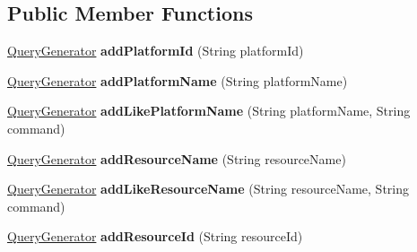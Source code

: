 \subsection*{Public Member Functions}
\begin{DoxyCompactItemize}
\item 
\hyperlink{classeu_1_1h2020_1_1symbiote_1_1query_1_1QueryGenerator}{Query\+Generator} {\bfseries add\+Platform\+Id} (String platform\+Id)\hypertarget{classeu_1_1h2020_1_1symbiote_1_1query_1_1QueryGenerator_a343acf8af004a11d7e8e9e6ce8f43855}{}\label{classeu_1_1h2020_1_1symbiote_1_1query_1_1QueryGenerator_a343acf8af004a11d7e8e9e6ce8f43855}

\item 
\hyperlink{classeu_1_1h2020_1_1symbiote_1_1query_1_1QueryGenerator}{Query\+Generator} {\bfseries add\+Platform\+Name} (String platform\+Name)\hypertarget{classeu_1_1h2020_1_1symbiote_1_1query_1_1QueryGenerator_a363f3573bce42e9c9173bb299ba6692b}{}\label{classeu_1_1h2020_1_1symbiote_1_1query_1_1QueryGenerator_a363f3573bce42e9c9173bb299ba6692b}

\item 
\hyperlink{classeu_1_1h2020_1_1symbiote_1_1query_1_1QueryGenerator}{Query\+Generator} {\bfseries add\+Like\+Platform\+Name} (String platform\+Name, String command)\hypertarget{classeu_1_1h2020_1_1symbiote_1_1query_1_1QueryGenerator_a252964b69c003dd49d94fe804f0101d0}{}\label{classeu_1_1h2020_1_1symbiote_1_1query_1_1QueryGenerator_a252964b69c003dd49d94fe804f0101d0}

\item 
\hyperlink{classeu_1_1h2020_1_1symbiote_1_1query_1_1QueryGenerator}{Query\+Generator} {\bfseries add\+Resource\+Name} (String resource\+Name)\hypertarget{classeu_1_1h2020_1_1symbiote_1_1query_1_1QueryGenerator_a5106c210fb367ee7de138087f35cf59a}{}\label{classeu_1_1h2020_1_1symbiote_1_1query_1_1QueryGenerator_a5106c210fb367ee7de138087f35cf59a}

\item 
\hyperlink{classeu_1_1h2020_1_1symbiote_1_1query_1_1QueryGenerator}{Query\+Generator} {\bfseries add\+Like\+Resource\+Name} (String resource\+Name, String command)\hypertarget{classeu_1_1h2020_1_1symbiote_1_1query_1_1QueryGenerator_a43eef490f07d9bf683715eba6e9ca33e}{}\label{classeu_1_1h2020_1_1symbiote_1_1query_1_1QueryGenerator_a43eef490f07d9bf683715eba6e9ca33e}

\item 
\hyperlink{classeu_1_1h2020_1_1symbiote_1_1query_1_1QueryGenerator}{Query\+Generator} {\bfseries add\+Resource\+Id} (String resource\+Id)\hypertarget{classeu_1_1h2020_1_1symbiote_1_1query_1_1QueryGenerator_a1734b1888a91c327976feaeaa1c1f0ba}{}\label{classeu_1_1h2020_1_1symbiote_1_1query_1_1QueryGenerator_a1734b1888a91c327976feaeaa1c1f0ba}


\end{DoxyCompactItemize}
